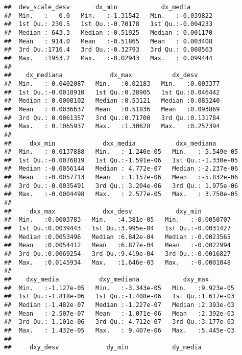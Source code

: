 \documentclass[11pt,]{article}
\begin{document}
\begin{verbatim}
##  dev_scale_desv       dx_min            dx_media        
##  Min.   :   0.0   Min.   :-1.31542   Min.   :-0.039822  
##  1st Qu.: 230.5   1st Qu.:-0.70178   1st Qu.:-0.004233  
##  Median : 643.3   Median :-0.51925   Median : 0.001170  
##  Mean   : 914.0   Mean   :-0.51865   Mean   : 0.003408  
##  3rd Qu.:1716.4   3rd Qu.:-0.32793   3rd Qu.: 0.008563  
##  Max.   :1953.2   Max.   :-0.02943   Max.   : 0.099444  
##                                                         
##    dx_mediana             dx_max           dx_desv        
##  Min.   :-0.0402087   Min.   :0.02183   Min.   :0.003377  
##  1st Qu.:-0.0018910   1st Qu.:0.28905   1st Qu.:0.046442  
##  Median : 0.0008102   Median :0.53121   Median :0.085240  
##  Mean   : 0.0036637   Mean   :0.51836   Mean   :0.093869  
##  3rd Qu.: 0.0061357   3rd Qu.:0.71700   3rd Qu.:0.131784  
##  Max.   : 0.1065937   Max.   :1.30628   Max.   :0.257394  
##                                                           
##     dxx_min             dxx_media           dxx_mediana        
##  Min.   :-0.0137888   Min.   :-1.240e-05   Min.   :-5.549e-05  
##  1st Qu.:-0.0076819   1st Qu.:-1.591e-06   1st Qu.:-1.330e-05  
##  Median :-0.0056144   Median : 4.772e-07   Median :-2.237e-06  
##  Mean   :-0.0057713   Mean   : 1.157e-06   Mean   :-5.832e-06  
##  3rd Qu.:-0.0035491   3rd Qu.: 3.204e-06   3rd Qu.: 1.975e-06  
##  Max.   :-0.0004498   Max.   : 2.577e-05   Max.   : 3.750e-05  
##                                                                
##     dxx_max             dxx_desv            dxy_min          
##  Min.   :0.0003783   Min.   :4.381e-05   Min.   :-0.0050707  
##  1st Qu.:0.0039443   1st Qu.:3.995e-04   1st Qu.:-0.0031427  
##  Median :0.0053496   Median :6.842e-04   Median :-0.0023565  
##  Mean   :0.0054412   Mean   :6.877e-04   Mean   :-0.0022994  
##  3rd Qu.:0.0069254   3rd Qu.:9.419e-04   3rd Qu.:-0.0016827  
##  Max.   :0.0145934   Max.   :1.646e-03   Max.   :-0.0001048  
##                                                              
##    dxy_media           dxy_mediana            dxy_max         
##  Min.   :-1.127e-05   Min.   :-3.343e-05   Min.   :9.923e-05  
##  1st Qu.:-1.818e-06   1st Qu.:-1.408e-06   1st Qu.:1.617e-03  
##  Median :-1.482e-07   Median :-1.227e-07   Median :2.393e-03  
##  Mean   :-2.507e-07   Mean   :-1.071e-06   Mean   :2.392e-03  
##  3rd Qu.: 1.101e-06   3rd Qu.: 4.712e-07   3rd Qu.:3.177e-03  
##  Max.   : 1.432e-05   Max.   : 9.407e-06   Max.   :5.445e-03  
##                                                               
##     dxy_desv             dy_min            dy_media         

\end{verbatim}
\end{document}
